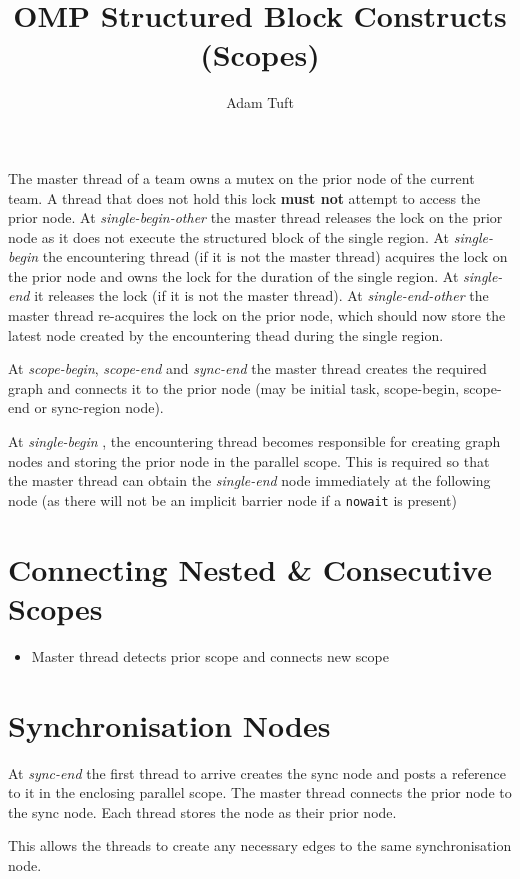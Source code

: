 \documentclass[11pt,a4paper]{article}
\title{OMP Structured Block Constructs (Scopes)}
\newcommand{\code}[1]{\texttt{#1} }
\begin{document}
\author{Adam Tuft}
\maketitle

The master thread of a team owns a mutex on the prior node of the current team. A thread that does not hold this lock \textbf{must not} attempt to access the prior node. At \emph{single-begin-other} the master thread releases the lock on the prior node as it does not execute the structured block of the single region. At \emph{single-begin} the encountering thread (if it is not the master thread) acquires the lock on the prior node and owns the lock for the duration of the single region. At \emph{single-end} it releases the lock (if it is not the master thread). At \emph{single-end-other} the master thread re-acquires the lock on the prior node, which should now store the latest node created by the encountering thead during the single region.

At \emph{scope-begin}, \emph{scope-end} and \emph{sync-end} the master thread creates the required graph and connects it to the prior node (may be initial task, scope-begin, scope-end or sync-region node).

At \emph{single-begin} , the encountering thread becomes responsible for creating graph nodes and storing the prior node in the parallel scope. This is required so that the master thread can obtain the \emph{single-end} node immediately at the following node (as there will not be an implicit barrier node if a \code{nowait} is present)

\section{Connecting Nested \& Consecutive Scopes}

\begin{itemize}
\item Master thread detects prior scope and connects new scope
\end{itemize}

\section{Synchronisation Nodes}

At \emph{sync-end} the first thread to arrive creates the sync node and posts a reference to it in the enclosing parallel scope. The master thread connects the prior node to the sync node. Each thread stores the node as their prior node.

This allows the threads to create any necessary edges to the same synchronisation node.
\end{document}
